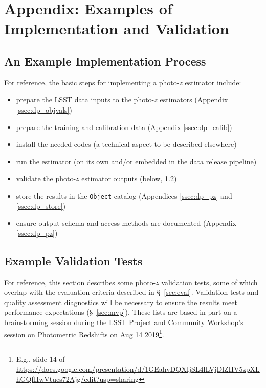 \documentclass[DM,lsstdraft,toc]{lsstdoc}
\begin{document}
\clearpage
\section{Appendix: Examples of Implementation and Validation}\label{sec:imp}

\subsection{An Example Implementation Process}\label{ssec:imp_imp}

For reference, the basic steps for implementing a photo-$z$ estimator include:
\vspace{-15pt}
\begin{itemize}
\item prepare the LSST data inputs to the photo-$z$ estimators (Appendix \ref{ssec:dp_objvals})
\item prepare the training and calibration data (Appendix \ref{ssec:dp_calib})
\item install the needed codes (a technical aspect to be described elsewhere)
\item run the estimator (on its own and/or embedded in the data release pipeline)
\item validate the photo-$z$ estimator outputs (below, \ref{ssec:imp_val})
\item store the results in the {\tt Object} catalog (Appendices \ref{ssec:dp_pz} and \ref{ssec:dp_store})
\item ensure output schema and access methods are documented (Appendix \ref{ssec:dp_pz})
\end{itemize}

\subsection{Example Validation Tests}\label{ssec:imp_val}

For reference, this section describes some photo-$z$ validation tests, some of which overlap with the evaluation criteria described in \S~\ref{sec:eval}. 
Validation tests and quality assessment diagnostics will be necessary to ensure the results meet performance expectations (\S~\ref{sec:mvp}).
These lists are based in part on a brainstorming session during the LSST Project and Community Workshop's session on Photometric Redshifts on Aug 14 2019\footnote{E.g., slide 14 of \url{https://docs.google.com/presentation/d/1GEahvDQXIjSL4lLVjDlZHV5zpXLhGQfHwVtucs72Ajg/edit?usp=sharing}}.
\end{document}
